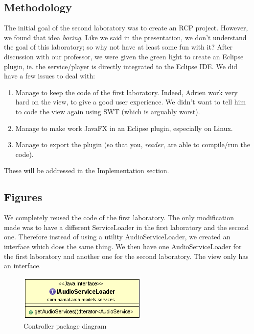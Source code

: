 \documentclass{report}
\begin{document}
\subsection{Methodology}

The initial goal of the second laboratory was to create an RCP project. However, we found that idea \textit{boring}. Like we said in the presentation, we don't understand the goal of this laboratory; so why not have at least some fun with it? After discussion with our professor, we were given the green light to create an Eclipse plugin, ie. the service/player is directly integrated to the Eclipse IDE. We did have a few issues to deal with:

\begin{enumerate}
\item Manage to keep the code of the first laboratory. Indeed, Adrien work very hard on the view, to give a good user experience. We didn't want to tell him to code the view again using SWT (which is arguably worst). 
\item Manage to make work JavaFX in an Eclipse plugin, especially on Linux.
\item Manage to export the plugin (so that you, \textit{reader}, are able to compile/run the code).
\end{enumerate}

These will be addressed in the Implementation section.

\subsection{Figures}

We completely reused the code of the first laboratory. The only modification made was to have a different ServiceLoader in the first laboratory and the second one. Therefore instead of using a utility AudioServiceLoader, we created an interface which does the same thing. We then have one AudioServiceLoader for the first laboratory and another one for the second laboratory. The view only has an interface.

\begin{center}
\begin{figure}[H]

  \includegraphics[scale=0.4]{class/AudioServiceLoader.png}
  \caption{Controller package diagram}
  \label{AudioServiceLoader}
\end{figure}
\end{center}
\end{document}
